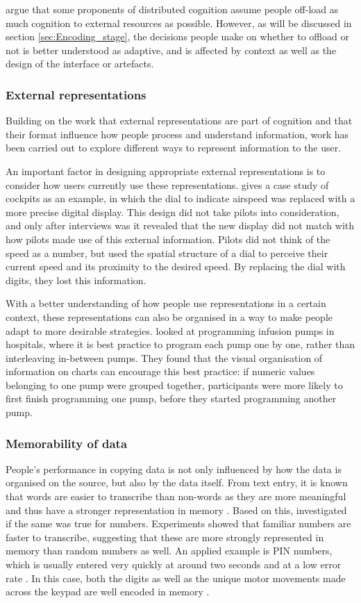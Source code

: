 \documentclass[11pt,oneside]{report}
\begin{document}
\citet{Payne2013} argue that some proponents of distributed cognition assume people off-load as much cognition to external resources as possible. However, as will be discussed in section \ref{sec:Encoding_stage}, the decisions people make on whether to offload or not is better understood as adaptive, and is affected by context as well as the design of the interface or artefacts. 

\subsubsection{External representations}
Building on the work that external representations are part of cognition and that their format influence how people process and understand information, work has been carried out to explore different ways to represent information to the user. 

An important factor in designing appropriate external representations is to consider how users currently use these representations. \citet{Hutchins1995} gives a case study of cockpits as an example, in which the dial to indicate airspeed was replaced with a more precise digital display. This design did not take pilots into consideration, and only after interviews was it revealed that the new display did not match with how pilots made use of this external information. Pilots did not think of the speed as a number, but used the spatial structure of a dial to perceive their current speed and its proximity to the desired speed. By replacing the dial with digits, they lost this information. 

With a better understanding of how people use representations in a certain context, these representations can also be organised in a way to make people adapt to more desirable strategies. \citet{Back2013b} looked at programming infusion pumps in hospitals, where it is best practice to program each pump one by one, rather than interleaving in-between pumps. They found that the visual organisation of information on charts can encourage this best practice: if numeric values belonging to one pump were grouped together, participants were more likely to first finish programming one pump, before they started programming another pump.

\subsubsection{Memorability of data}
People's performance in copying data is not only influenced by how the data is organised on the source, but also by the data itself.
From text entry, it is known that words are easier to transcribe than non-words as they are more meaningful and thus have a stronger representation in memory \citep{Salthouse1986}. Based on this, \citet{Wiseman2014} investigated if the same was true for numbers. Experiments showed that familiar numbers are faster to transcribe, suggesting that these are more strongly represented in memory than random numbers as well.
An applied example is PIN numbers, which is usually entered very quickly at around two seconds and at a low error rate \citep{DeLuca2010}. In this case, both the digits as well as the unique motor movements made across the keypad are well encoded in memory \citep{Mangen2010}. 
\end{document}
